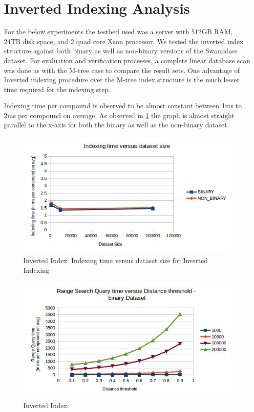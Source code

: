 \section{Inverted Indexing Analysis}

For the below experiments the testbed used was a server with 512GB RAM, 24TB disk space, and 2 quad core Xeon processor. We tested the inverted index structure against both binary as well as non-binary versions of the Swamidass dataset. For evaluation and verification processes, a complete linear database scan was done as with the M-tree case to compare the result sets. One advantage of Inverted indexing procedure over the M-tree index structure is the much lesser time required for the indexing step. 

Indexing time per compound is observed to be almost constant between 1ms to 2ms per compound on average. As observed in \ref{fig:5I1} the graph is almost straight parallel to the x-axis for both the binary as well as the non-binary dataset.


\begin{figure}[ht]	
\centering
\includegraphics[width=1 \columnwidth]{img/imageI1.jpg}
\caption{Inverted Index: Indexing time versus dataset size for Inverted Indexing}
\label{fig:5I1}
\end{figure}


\begin{figure}[ht]	
\centering
\includegraphics[width=1 \columnwidth]{img/imageI2.jpg}
\caption{Inverted Index: }
\label{fig:5I2}
\end{figure}

